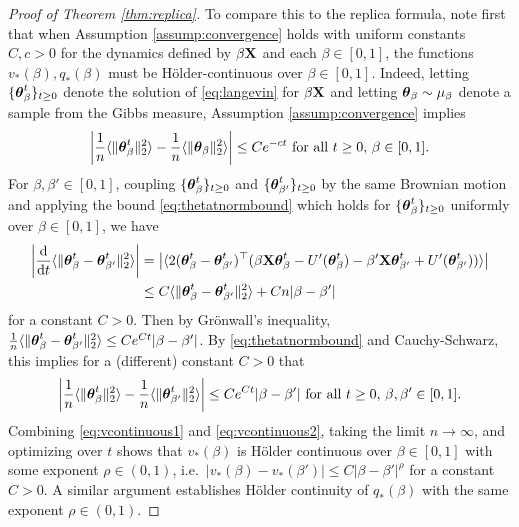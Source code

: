 \begin{proof}[Proof of Theorem \ref{thm:replica}]
To compare this to the replica formula, note first that
when Assumption \ref{assump:convergence} holds with
uniform constants $C,c>0$ for the dynamics defined by $\beta\mathbf{X}$ and each
$\beta \in [0,1]$, the functions $v_*(\beta),q_*(\beta)$ must be 
H\"older-continuous over $\beta \in [0,1]$.
Indeed, letting $\{\boldsymbol{\theta}_\beta^t\}_{t \geq 0}$
denote the solution of \eqref{eq:langevin} for $\beta\mathbf{X}$ and letting
$\boldsymbol{\theta}_\beta \sim \mu_\beta$ denote a sample from the Gibbs measure,
Assumption \ref{assump:convergence} implies
\begin{equation}\label{eq:vcontinuous1}
\left|\frac{1}{n}\langle \|\boldsymbol{\theta}_\beta^t\|_2^2 \rangle
-\frac{1}{n}\langle \|\boldsymbol{\theta}_\beta\|_2^2 \rangle\right| \leq Ce^{-ct}
\text{ for all } t \geq 0,\,\beta \in [0,1].
\end{equation}
For $\beta,\beta' \in [0,1]$, coupling $\{\boldsymbol{\theta}_\beta^t\}_{t \geq 0}$ and
$\{\boldsymbol{\theta}_{\beta'}^t\}_{t \geq 0}$ by the same Brownian motion and applying
the bound \eqref{eq:thetatnormbound} which holds for
$\{\boldsymbol{\theta}^t_\beta\}_{t \geq 0}$ uniformly over $\beta \in [0,1]$, we have
\begin{align*}
\left|\frac{\mathrm{d}}{\mathrm{d} t}\langle \|\boldsymbol{\theta}_\beta^t-\boldsymbol{\theta}_{\beta'}^t\|_2^2
\rangle\right|
&=\left|\langle 2(\boldsymbol{\theta}_\beta^t-\boldsymbol{\theta}_{\beta'}^t)^\top
(\beta \mathbf{X}\boldsymbol{\theta}_\beta^t-U'(\boldsymbol{\theta}_\beta^t)
-\beta' \mathbf{X}\boldsymbol{\theta}_{\beta'}^t+U'(\boldsymbol{\theta}_{\beta'}^t))\rangle\right|\\
&\leq C\langle \|\boldsymbol{\theta}_\beta^t-\boldsymbol{\theta}_{\beta'}^t\|_2^2 \rangle
+Cn|\beta-\beta'|
\end{align*}
for a constant $C>0$. Then by Gr\"onwall's inequality, $\frac{1}{n}\langle
\|\boldsymbol{\theta}_\beta^t-\boldsymbol{\theta}_{\beta'}^t\|_2^2 \rangle \leq Ce^{Ct}|\beta-\beta'|$.
By \eqref{eq:thetatnormbound} and Cauchy-Schwarz, this implies for a (different)
constant $C>0$ that
\begin{equation}\label{eq:vcontinuous2}
\left|\frac{1}{n}\langle \|\boldsymbol{\theta}_\beta^t\|_2^2 \rangle
-\frac{1}{n}\langle \|\boldsymbol{\theta}_{\beta'}^t\|_2^2 \rangle\right|
\leq Ce^{Ct}|\beta-\beta'| \text{ for all } t \geq 0,\,\beta,\beta' \in [0,1].
\end{equation}
Combining \eqref{eq:vcontinuous1} and \eqref{eq:vcontinuous2}, taking the limit
$n \to\infty$, and optimizing over $t$ shows that $v_*(\beta)$ is H\"older
continuous over $\beta \in [0,1]$ with some exponent $\rho \in (0,1)$,
i.e.\ $|v_*(\beta)-v_*(\beta')| \leq C|\beta-\beta'|^\rho$ for a constant $C>0$.
 A similar argument establishes H\"older continuity
of $q_*(\beta)$ with the same exponent $\rho \in (0,1)$.


\end{proof}
